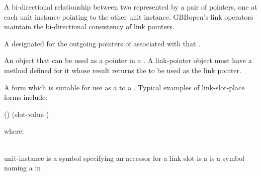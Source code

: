 \begin{glossary-list}

\glent[link]
%
%
%
A bi-directional relationship between two  represented
by a pair of pointers, one at each unit instance pointing to the other unit
instance.  GBBopen's link operators maintain the bi-directional consistency of
link pointers.


%
%
%
A  designated for the outgoing pointers of 
associated with that .


%
%
%
%
%
%
%
%
An object that can be used as a pointer in a .  A
link-pointer object must have a 
method defined for it whose result returns the  to be
used as the link pointer.


%
%
%
%
A form which is suitable for use as a  to a
.  Typical examples of link-slot-place forms include:
%
\W\supp\notpretop
\T\vspace{4pt}
\begin{example}
  ()
  (slot-value )
\end{example}
where:
\W\\~\\
\begin{args}{unit-instance}
 is a symbol specifying an accessor  for
  a link slot
 is a 
 is a symbol naming a  in
\end{args}



\end{glossary-list}
